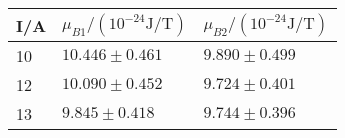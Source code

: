 \begin{tabular}{lll}
\toprule
I/A & $\mu_{B1}/(10^{-24}\si{\joule\per\tesla})$ & $\mu_{B2}/(10^{-24}\si{\joule\per\tesla})$ \\
\midrule
 10 &                         $10.446 \pm 0.461$ &                          $9.890 \pm 0.499$ \\
 12 &                         $10.090 \pm 0.452$ &                          $9.724 \pm 0.401$ \\
 13 &                          $9.845 \pm 0.418$ &                          $9.744 \pm 0.396$ \\
\bottomrule
\end{tabular}
